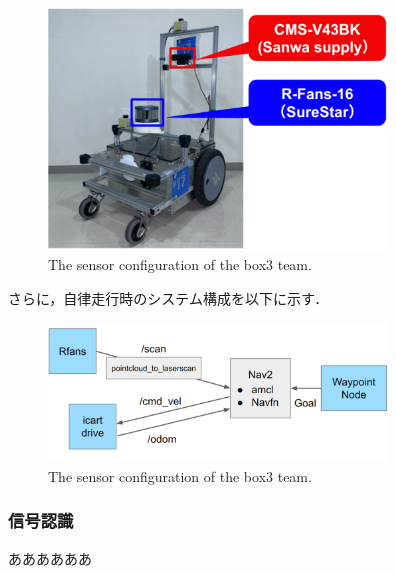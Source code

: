\documentclass[twocolumn, 9pt]{jsproceedings}
\begin{document}
\begin{figure}[h!]
  \centering
  \includegraphics[width=90mm]{fig/box3_sensor.pdf}
  \caption{The sensor configuration of the box3 team.}
  \label{fig:box3-sensor}
\end{figure}


さらに，自律走行時のシステム構成を以下に示す．

\begin{figure}[h!]
  \centering
  \includegraphics[width=90mm]{fig/box3_system.pdf}
  \caption{The sensor configuration of the box3 team.}
  \label{fig:box3-system}
\end{figure}


\subsubsection{信号認識}
ああああああ
\end{document}
